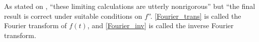 As stated on \cite{page 205, FAA}, ``these limiting calculations are utterly nonrigorous'' but ``the final result is correct under suitable conditions on $f$''. \eqref{Fourier_trans} is called the Fourier transform of $f(t)$, and \eqref{Fourier_inv} is called the inverse Fourier transform.

%
%

